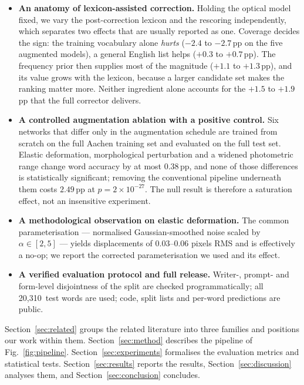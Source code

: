 \documentclass[conference]{IEEEtran}
\newcommand{\deltawa}{0.38\,pp}
\newcommand{\nsamples}{20{,}310}
\begin{document}
\begin{itemize}
  \item \textbf{An anatomy of lexicon-assisted correction.} Holding the
        optical model fixed, we vary the post-correction lexicon and the
        rescoring independently, which separates two effects that are
        usually reported as one. Coverage decides the sign: the training
        vocabulary alone \emph{hurts} ($-2.4$ to $-2.7$\,pp on the five
        augmented models), a general English list helps ($+0.3$ to
        $+0.7$\,pp). The frequency prior then supplies most of the
        magnitude ($+1.1$ to $+1.3$\,pp), and its value grows with the
        lexicon, because a larger candidate set makes the ranking
        matter more. Neither ingredient alone accounts for the
        $+1.5$ to $+1.9$\,pp that the full corrector delivers.
  \item \textbf{A controlled augmentation ablation with a positive
        control.} Six networks that differ only in the augmentation
        schedule are trained from scratch on the full Aachen training
        set and evaluated on the full test set. Elastic deformation,
        morphological perturbation and a widened photometric range
        change word accuracy by at most \deltawa, and none of those
        differences is statistically significant; removing the
        conventional pipeline underneath them costs $2.49$\,pp at
        $p=2\times10^{-27}$. The null result is therefore a saturation
        effect, not an insensitive experiment.
  \item \textbf{A methodological observation on elastic deformation.}
        The common parameterisation --- normalised Gaussian-smoothed
        noise scaled by $\alpha\in[2,5]$ --- yields displacements of
        0.03--0.06 pixels RMS and is effectively a no-op; we report the
        corrected parameterisation we used and its effect.
  \item \textbf{A verified evaluation protocol and full release.}
        Writer-, prompt- and form-level disjointness of the split are
        checked programmatically; all \nsamples\ test words are used;
        code, split lists and per-word predictions are public.
\end{itemize}

Section~\ref{sec:related} groups the related literature into three
families and positions our work within them.
Section~\ref{sec:method} describes the pipeline of
Fig.~\ref{fig:pipeline}. Section~\ref{sec:experiments} formalises the
evaluation metrics and statistical tests.
Section~\ref{sec:results} reports the results,
Section~\ref{sec:discussion} analyses them, and
Section~\ref{sec:conclusion} concludes.
\end{document}
